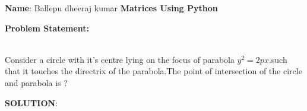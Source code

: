 \documentclass[10pt,a4paper]{report}
\begin{document}
\raggedright \textbf{Name}:\hspace{1mm} Ballepu dheeraj kumar \hspace{3cm} \Large \textbf{Matrices Using Python}\hspace{2.5cm} %
\begin{multicols}{2}

\raggedright \textbf{Problem Statement:}\vspace{2mm}
\raggedright \\Consider a circle with it's centre lying on the focus of parabola $y^2=2px$.such that it touches the directrix of the parabola.The point of intersection of the circle and parabola is ?\\
\vspace{5mm}
\raggedright \textbf{SOLUTION}:\vspace{2mm}\\


\end{multicols}
\end{document}

